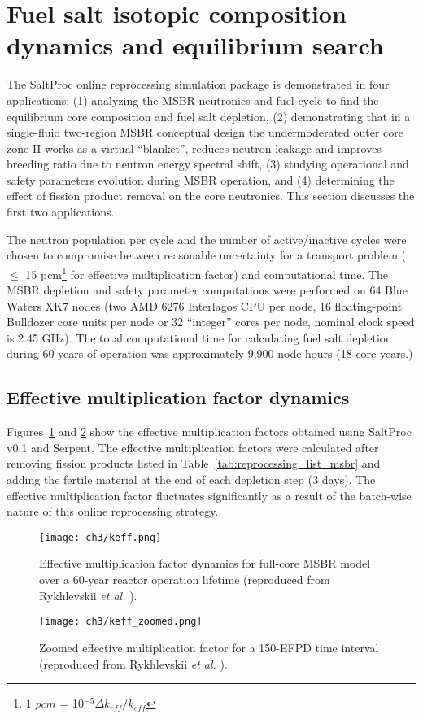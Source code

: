 \section{Fuel salt isotopic composition dynamics and equilibrium search}
\label{sec:equilibrium_search}
The SaltProc online reprocessing simulation package is demonstrated in four 
applications: 
(1) analyzing the \gls{MSBR} neutronics and fuel cycle to find 
the equilibrium core composition and fuel salt depletion, 
(2) demonstrating that in a single-fluid two-region \gls{MSBR} conceptual 
design the undermoderated outer core zone II works as a virtual ``blanket'', 
reduces neutron leakage and improves breeding ratio due to neutron energy 
spectral shift,
(3) studying operational and safety parameters evolution during \gls{MSBR} 
operation, and
(4) determining the effect of fission product removal on the core neutronics. 
This section discusses the first two applications.

The neutron population per cycle and the number of active/inactive cycles were 
chosen to compromise between reasonable uncertainty for a transport 
problem ($\leq$ 15 pcm\footnote{ $1$ $pcm$ = 10$^{-5}\Delta k_{eff}/k_{eff}$} 
for effective multiplication factor) and computational time. The \gls{MSBR} 
depletion and safety parameter computations were performed on 64 Blue Waters 
XK7 nodes (two AMD 6276 Interlagos CPU per node, 16 floating-point Bulldozer 
core units per node or 32 ``integer'' cores per node, nominal clock speed is 
2.45 GHz). The total computational time for calculating fuel salt depletion  
during 60 years of operation was approximately 9,900 node-hours (18 
core-years.)

\subsection{Effective multiplication factor dynamics}
Figures~\ref{fig:keff} and \ref{fig:keff_zoomed} show the effective 
multiplication factors obtained using SaltProc v0.1 and Serpent. The effective 
multiplication factors were calculated after removing fission products listed 
in Table~\ref{tab:reprocessing_list_msbr} and adding the fertile material at 
the end of each depletion step (3 days). The effective multiplication factor 
fluctuates significantly as a result of the batch-wise nature of this online 
reprocessing strategy. 
\begin{figure}[ht!] 
	\centering
	\texttt{[image: ch3/keff.png]}
	\caption{Effective multiplication factor dynamics for full-core \gls{MSBR} 
		model over a 60-year reactor operation lifetime (reproduced 
		from Rykhlevskii \emph{et al.} \cite{rykhlevskii_modeling_2019}).}
	\label{fig:keff}
\end{figure}
\begin{figure}[ht!] 
	\centering
	\texttt{[image: ch3/keff\_zoomed.png]}
	\caption{Zoomed effective multiplication factor for a 150-EFPD time 
	interval (reproduced from Rykhlevskii \emph{et al.}  
	\cite{rykhlevskii_modeling_2019}).}
	\label{fig:keff_zoomed}
\end{figure}

